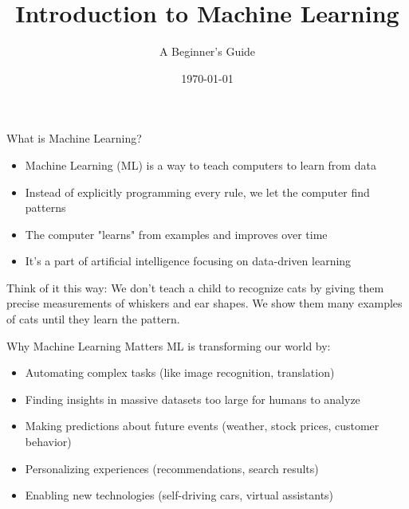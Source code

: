 \documentclass{beamer}
\title{Introduction to Machine Learning}
\subtitle{A Beginner's Guide}
\author{}
\date{\today}
\begin{document}
\begin{frame}
  \titlepage
\end{frame}

\begin{frame}{What is Machine Learning?}
  \begin{itemize}
    \item Machine Learning (ML) is a way to teach computers to learn from data
    \item Instead of explicitly programming every rule, we let the computer find patterns
    \item The computer "learns" from examples and improves over time
    \item It's a part of artificial intelligence focusing on data-driven learning
  \end{itemize}
  
  \vspace{0.5cm}
  Think of it this way: We don't teach a child to recognize cats by giving them precise measurements of whiskers and ear shapes. We show them many examples of cats until they learn the pattern.
\end{frame}

\begin{frame}{Why Machine Learning Matters}
  ML is transforming our world by:
  
  \begin{itemize}
    \item Automating complex tasks (like image recognition, translation)
    \item Finding insights in massive datasets too large for humans to analyze
    \item Making predictions about future events (weather, stock prices, customer behavior)
    \item Personalizing experiences (recommendations, search results)
    \item Enabling new technologies (self-driving cars, virtual assistants)
  \end{itemize}
\end{frame}
\end{document}
